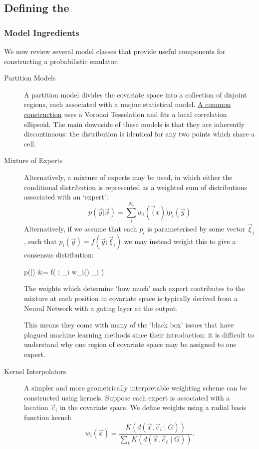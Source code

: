 \subsection{Defining the \fade{}}
	\subsubsection{Model Ingredients}

		We now review several model classes that provide useful components for constructing a probabilistic emulator.


		\begin{description}
			\item[Partition Models] A partition model divides the covariate space into a collection of disjoint regions, each associated with a unqiue statistical model. \href{https://www.jstor.org/stable/pdf/48583762.pdf}{A common construction} uses a Voronoi Tesselation and fits a local correlation ellipsoid. The main downside of these models is that they are inherently discontinuous: the distribution is identical for any two points which share a cell.
			\item[Mixture of Experts] Alternatively, a mixture of experts may be used, in which either the conditional distribution is represented as a weighted sum of distributions associated with an `expert':
			      \begin{equation}
				      p(\vec{y} | \vec{x}) = \sum_i^{N_e} w_i(\vec(x)) p_i(\vec{y})
			      \end{equation}
			      Alternatively, if we assume that each $p_i$ is parameterised by some vector $\vec{\xi}_i$, such that $p_i(\vec{y}) = f(\vec{y} ; \vec{\xi}_i)$ we may instead weight this to give a consensus distribution:
			      \begin{spalign}
				      p(|) &= f\left( ; \sum_i w_i() \vec{\xi}_i \right)
			      \end{spalign}
			      The weights which determine `how much' each expert contributes to the mixture at each position in covariate space is typically derived from a Neural Network with a gating layer at the output.

			      This means they come with many of the 'black box' issues that have plagued machine learning methods since their introduction: it is difficult to understand why one region of covariate space may be assigned to one expert.
			\item[Kernel Interpolators] A simpler and more geometrically interpretable weighting scheme can be constructed using kernels.
			      Suppose each expert is associated with a location $\vec{c}_i$ in the covariate space. We define weights using a radial basis function kernel:
			      \begin{equation}
				      w_i(\vec{x}) =
				      \frac{K\!\left(d(\vec{x},\vec{c}_i \mid G)\right)}
				      {\sum_{\ell} K\!\left(d(\vec{x},\vec{c}_\ell \mid G)\right)}.
			      \end{equation}


\end{description}
